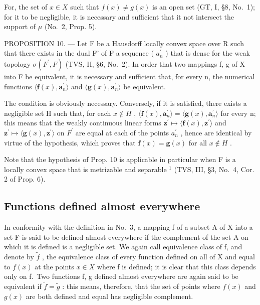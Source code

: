 For, the set of \(x \in X\) such that \(f(x) \neq g(x)\) is an open set (GT, I, §8, No.~1); for it to be negligible, it is necessary and sufficient that it not intersect the support of \(\mu\) (No.~2, Prop. 5).

PROPOSITION 10. --- Let F be a Hausdorff locally convex space over R such that there exists in the dual F' of F a sequence ( \(a_{n}^{\prime}\) ) that is dense for the weak topology \(\sigma(F^{\prime},F)\) (TVS, II, §6, No.~2). In order that two mappings f, g of X into F be equivalent, it is necessary and sufficient that, for every n, the numerical functions \(\langle\mathbf{f}(x),\mathbf{a}_{n}^{\prime}\rangle\) and \(\langle\mathbf{g}(x),\mathbf{a}_{n}^{\prime}\rangle\) be equivalent.

The condition is obviously necessary. Conversely, if it is satisfied, there exists a negligible set H such that, for each \(x \notin H\) , \(\langle \mathbf{f}(x), \mathbf{a}_{n}^{\prime} \rangle = \langle \mathbf{g}(x), \mathbf{a}_{n}^{\prime} \rangle\) for every n; this means that the weakly continuous linear forms \(\mathbf{z}^{\prime} \mapsto \langle \mathbf{f}(x), \mathbf{z}^{\prime} \rangle\) and \(\mathbf{z}^{\prime} \mapsto \langle \mathbf{g}(x), \mathbf{z}^{\prime} \rangle\) on \(F^{\prime}\) are equal at each of the points \(a_{n}^{\prime}\) , hence are identical by virtue of the hypothesis, which proves that \(\mathbf{f}(x) = \mathbf{g}(x)\) for all \(x \notin H\) .

Note that the hypothesis of Prop. 10 is applicable in particular when F is a locally convex space that is metrizable and separable \(^{1}\) (TVS, III, §3, No.~4, Cor. 2 of Prop. 6).

\subsection{Functions defined almost everywhere}

In conformity with the definition in No.~3, a mapping f of a subset A of X into a set F is said to be defined almost everywhere if the complement of the set A on which it is defined is a negligible set. We again call equivalence class of f, and denote by \(\widetilde{f}\) , the equivalence class of every function defined on all of X and equal to \(f(x)\) at the points \(x \in X\) where f is defined; it is clear that this class depends only on f.~Two functions f, g defined almost everywhere are again said to be equivalent if \(\widetilde{f} = \widetilde{g}\) : this means, therefore, that the set of points where \(f(x)\) and \(g(x)\) are both defined and equal has negligible complement.

